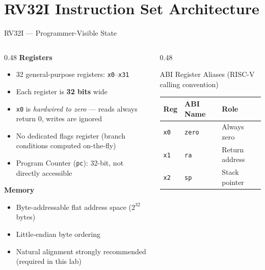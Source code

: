 \documentclass[aspectratio=169,10pt]{beamer}
\begin{document}
\section{RV32I Instruction Set Architecture}

\begin{frame}{RV32I --- Programmer-Visible State}
  \begin{columns}[T]
    \begin{column}{0.48\textwidth}
      \textbf{Registers}
      \begin{itemize}
        \item 32 general-purpose registers: \texttt{x0}--\texttt{x31}
        \item Each register is \textbf{32 bits} wide
        \item \texttt{x0} is \emph{hardwired to zero} --- reads always return 0, writes are ignored
        \item No dedicated flags register (branch conditions computed on-the-fly)
        \item Program Counter (\texttt{pc}): 32-bit, not directly accessible
      \end{itemize}
      \vspace{0.5em}
      \textbf{Memory}
      \begin{itemize}
        \item Byte-addressable flat address space ($2^{32}$ bytes)
        \item Little-endian byte ordering
        \item Natural alignment strongly recommended (required in this lab)
      \end{itemize}
    \end{column}
    \begin{column}{0.48\textwidth}
      \begin{block}{ABI Register Aliases (RISC-V calling convention)}
        \renewcommand{\arraystretch}{1.1}
        \scriptsize
        \begin{tabular}{lll}
          \toprule
          Reg & ABI Name & Role \\
          \midrule
          \texttt{x0}  & \texttt{zero} & Always zero \\
          \texttt{x1}  & \texttt{ra}   & Return address \\
          \texttt{x2}  & \texttt{sp}   & Stack pointer \\

\end{tabular}
\end{block}
\end{column}
\end{columns}
\end{frame}
\end{document}
